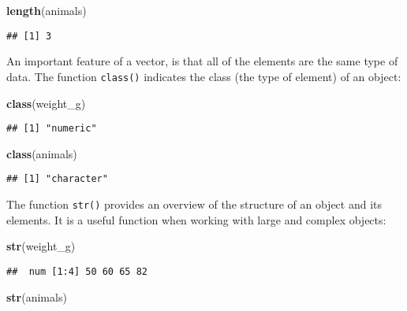 \documentclass[]{book}
\newenvironment{Shaded}{\begin{snugshade}}{\end{snugshade}}
\newcommand{\KeywordTok}[1]{\textcolor[rgb]{0.13,0.29,0.53}{\textbf{#1}}}
\newcommand{\NormalTok}[1]{#1}
\begin{document}
\begin{Shaded}
\begin{Highlighting}[]
\KeywordTok{length}\NormalTok{(animals)}
\end{Highlighting}
\end{Shaded}

\begin{verbatim}
## [1] 3
\end{verbatim}

An important feature of a vector, is that all of the elements are the same type of data. The function \texttt{class()} indicates the class (the type of element) of an object:

\begin{Shaded}
\begin{Highlighting}[]
\KeywordTok{class}\NormalTok{(weight_g)}
\end{Highlighting}
\end{Shaded}

\begin{verbatim}
## [1] "numeric"
\end{verbatim}

\begin{Shaded}
\begin{Highlighting}[]
\KeywordTok{class}\NormalTok{(animals)}
\end{Highlighting}
\end{Shaded}

\begin{verbatim}
## [1] "character"
\end{verbatim}

The function \texttt{str()} provides an overview of the structure of an object and its elements. It is a useful function when working with large and complex objects:

\begin{Shaded}
\begin{Highlighting}[]
\KeywordTok{str}\NormalTok{(weight_g)}
\end{Highlighting}
\end{Shaded}

\begin{verbatim}
##  num [1:4] 50 60 65 82
\end{verbatim}

\begin{Shaded}
\begin{Highlighting}[]
\KeywordTok{str}\NormalTok{(animals)}
\end{Highlighting}
\end{Shaded}
\end{document}
